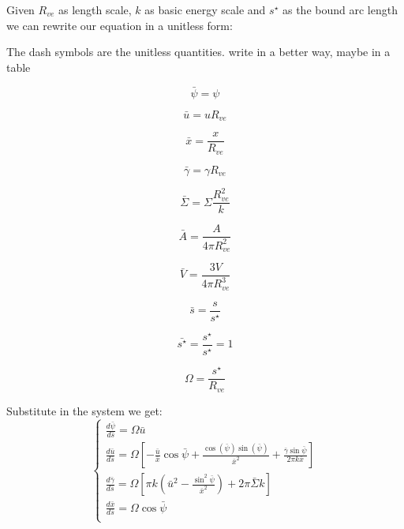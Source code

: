 \documentclass[12pt]{article}
\begin{document}
Given $R_{ve}$ as length scale, $k$ as basic energy scale and $s^\star$ as the bound arc length we can rewrite our equation in a unitless form:

The dash symbols are the unitless quantities.
\alert{write in a better way, maybe in a table}


$$
\bar{\psi} = \psi
$$

$$
\bar{u} = u R_{ve}
$$

$$
\bar{x} = \frac{x}{R_{ve}}
$$

$$
\bar{\gamma} = \gamma R_{ve}
$$

$$
\bar{\Sigma} = \Sigma \frac{R_{ve}^2}{k}
$$

$$
\bar{A} = \frac{A}{4 \pi R_{ve}^2 }
$$

$$
\bar{V} = \frac{3V}{4 \pi R_{ve}^3 }
$$

$$
\bar{s} = \frac{s}{s^\star}
$$

$$
\bar{s^\star} = \frac{s^\star}{s^\star} = 1
$$

$$
\Omega = \frac{s^\star}{R_{ve}}
$$
 

Substitute in the system we get:
\begin{equation}
  \begin{cases} 
    
    \frac{d\bar{\psi}}{d\bar{s}} = \Omega \bar{u} \\[3mm]
    \frac{d\bar{u}}{d\bar{s}} = \Omega [-\frac{\bar{u}}{\bar{x}}\cos\bar{\psi}+\frac{\cos(\bar{\psi})\sin(\bar{\psi})}{\bar{x}^2}+\frac{\bar{\gamma}\sin \bar{\psi}}{2\pi k \bar{x}}] \\[3mm]
    \frac{d\bar{\gamma}}{d\bar{s}} = \Omega [\pi k (\bar{u}^2-\frac{\sin^2 \bar{\psi}}{\bar{x}^2})+2 \pi \bar{\Sigma} k] \\[3mm]
    \frac{d\bar{x}}{d\bar{s}} = \Omega \cos \bar{\psi} \\[3mm]
  \end{cases}
\end{equation}



\end{document}
